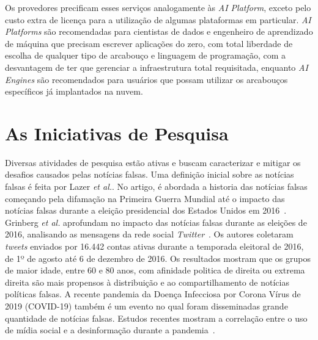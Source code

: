 \documentclass{SBCbookchapter}
\begin{document}
Os provedores precificam esses serviços analogamente às \textit{AI Platform}, exceto pelo custo extra de licença para a utilização de algumas plataformas em particular.
\textit{AI Platforms} são recomendadas para cientistas de dados e engenheiro de aprendizado de máquina que precisam escrever aplicações do zero, com total liberdade de escolha de qualquer tipo de arcabouço e linguagem de programação, com a desvantagem de ter que gerenciar a infraestrutura total requisitada, enquanto \textit{AI Engines} são recomendados para usuários que possam utilizar os arcabouços específicos já implantados na nuvem.





\section{As Iniciativas de Pesquisa}
\label{sec:pesquisa}

Diversas atividades de pesquisa estão ativas e buscam caracterizar e mitigar os desafios causados pelas notícias falsas.
Uma definição inicial sobre as notícias falsas é feita por Lazer \textit{et al.}. No artigo, é abordada a historia das notícias falsas começando pela difamação na Primeira Guerra Mundial até o impacto das notícias falsas durante a eleição presidencial dos Estados Unidos em 2016~\cite{lazer2018science}. Grinberg \textit{et al.} aprofundam no impacto das notícias falsas durante as eleições de 2016, analisando as mensagens da rede social \textit{Twitter}~\cite{grinberg2019fake}. Os autores coletaram \textit{tweets} enviados por 16.442 contas ativas durante a temporada eleitoral de 2016, de 1º de agosto até 6 de dezembro de 2016. Os resultados mostram que os grupos de maior idade, entre 60 e 80 anos, com afinidade politica de direita ou extrema direita são mais propensos à distribuição e ao compartilhamento de notícias políticas falsas. A recente pandemia da Doença Infecciosa por Corona Vírus de 2019 (COVID-19) também é um evento no qual foram disseminadas grande quantidade de notícias falsas. Estudos recentes mostram a correlação entre o uso de mídia social e a desinformação durante a pandemia~\cite{pennycook2020fighting, van2020using}.  
\end{document}
